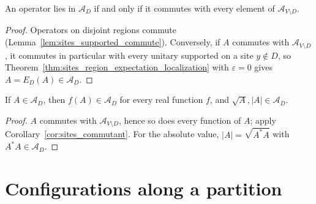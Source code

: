 \begin{corollary}
    \label{cor:sites_commutant}
    \leanok
    An operator lies in $\mathcal A_D$ if and only if it commutes with every
    element of $\mathcal A_{V\setminus D}$.
\end{corollary}
\begin{proof}\leanok
    Operators on disjoint regions commute
    (Lemma~\ref{lem:sites_supported_commute}). Conversely, if $A$ commutes
    with $\mathcal A_{V\setminus D}$, it commutes in particular with every
    unitary supported on a site $y\notin D$, so
    Theorem~\ref{thm:sites_region_expectation_localization} with
    $\varepsilon=0$ gives $A=E_D(A)\in\mathcal A_D$.
\end{proof}

\begin{corollary}
    \label{cor:sites_cfc_support}
    \leanok
    If $A\in\mathcal A_D$, then $f(A)\in\mathcal A_D$ for every real function $f$,
    and $\sqrt A,\lvert A\rvert\in\mathcal A_D$.
\end{corollary}
\begin{proof}\leanok
    $A$ commutes with $\mathcal A_{V\setminus D}$, hence so does every function of
    $A$; apply Corollary~\ref{cor:sites_commutant}. For the absolute value,
    $\lvert A\rvert=\sqrt{A^*A}$ with $A^*A\in\mathcal A_D$.
\end{proof}

\section{Configurations along a partition}
\label{sec:sites_partition}

